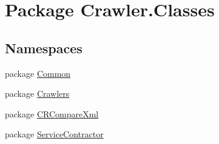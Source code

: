 \hypertarget{namespace_crawler_1_1_classes}{\section{Package Crawler.\-Classes}
\label{namespace_crawler_1_1_classes}
}
\subsection*{Namespaces}
\begin{DoxyCompactItemize}
\item 
package \hyperlink{namespace_crawler_1_1_classes_1_1_common}{Common}
\item 
package \hyperlink{namespace_crawler_1_1_classes_1_1_crawlers}{Crawlers}
\item 
package \hyperlink{namespace_crawler_1_1_classes_1_1_c_r_compare_xml}{C\-R\-Compare\-Xml}
\item 
package \hyperlink{namespace_crawler_1_1_classes_1_1_service_contractor}{Service\-Contractor}
\end{DoxyCompactItemize}
